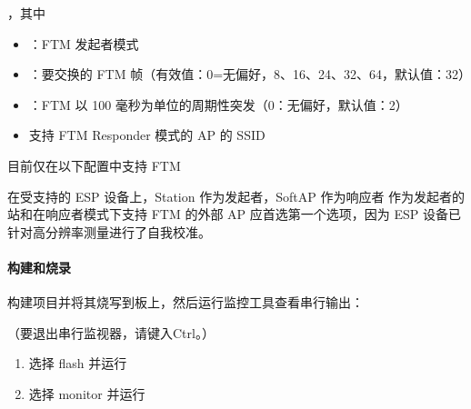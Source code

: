 \documentclass[a4paper,12pt,english]{sphinxmanual}
\begin{document}
{{\sphinxAtStartPar
{} ，其中
\begin{itemize}
\item {} 
\sphinxAtStartPar
{}：FTM 发起者模式

\item {} 
\sphinxAtStartPar
{}：要交换的 FTM 帧（有效值：0=无偏好，8、16、24、32、64，默认值：32）

\item {} 
\sphinxAtStartPar
{}：FTM 以 100 毫秒为单位的周期性突发（0：无偏好，默认值：2）

\item {} 
\sphinxAtStartPar
{} 支持 FTM Responder 模式的 AP 的 SSID

\end{itemize}

\sphinxAtStartPar
目前仅在以下配置中支持 FTM \sphinxhyphen{}

\sphinxAtStartPar
在受支持的 ESP 设备上，Station 作为发起者，SoftAP 作为响应者
作为发起者的站和在响应者模式下支持 FTM 的外部 AP 应首选第一个选项，因为 ESP 设备已针对高分辨率测量进行了自我校准。


\paragraph{构建和烧录}
\label{\detokenize{exp-esp32/wifi/ftm:id4}}
\sphinxAtStartPar
构建项目并将其烧写到板上，然后运行监控工具查看串行输出：

\sphinxAtStartPar
{}

\sphinxAtStartPar
{} （要退出串行监视器，请键入Ctrl\sphinxhyphen{}{]}。）

\sphinxAtStartPar
{}
\begin{enumerate}
%
\item {} 
\sphinxAtStartPar
选择 flash 并运行

\item {} 
\sphinxAtStartPar
选择 monitor 并运行


\end{enumerate}}}
\end{document}

